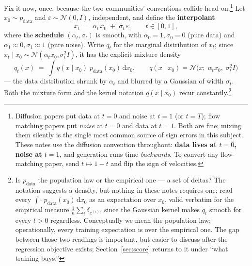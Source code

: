 \documentclass[10pt,a4paper]{article}
\newcommand{\dd}{\mathrm{d}}
\newcommand{\veps}{\varepsilon}
\begin{document}
Fix it now, once, because the two communities' conventions collide
head-on.\footnote{Diffusion papers put data at $t=0$ and noise at $t=1$ (or
$t=T$); flow matching papers put \emph{noise} at $t=0$ and data at $t=1$.
Both are fine; mixing them silently is the single most common source of
sign errors in this subject. These notes use the diffusion convention
throughout: \textbf{data lives at $t=0$, noise at $t=1$}, and generation
runs time \emph{backwards}. To convert any flow-matching paper, send
$t \mapsto 1 - t$ and flip the sign of velocities.}
Let $x_0 \sim p_{\mathrm{data}}$ and $\veps \sim \mathcal{N}(0, I)$,
independent, and define the \textbf{interpolant}
\begin{equation}
x_t \;=\; \alpha_t\, x_0 \;+\; \sigma_t\, \veps,
\qquad t \in [0, 1],
\label{eq:interpolant}
\end{equation}
where the \textbf{schedule} $(\alpha_t, \sigma_t)$ is smooth, with
$\alpha_0 = 1, \sigma_0 = 0$ (pure data) and
$\alpha_1 \approx 0, \sigma_1 \approx 1$ (pure noise). Write $q_t$ for the
marginal distribution of $x_t$; since
$x_t \mid x_0 \sim \mathcal{N}(\alpha_t x_0, \sigma_t^2 I)$, it has the
explicit mixture density
\begin{equation}
q_t(x) \;=\; \int q(x \mid x_0)\; p_{\mathrm{data}}(x_0)\, \dd x_0,
\qquad
q(x \mid x_0) = \mathcal{N}\big(x;\; \alpha_t x_0,\; \sigma_t^2 I\big)
\label{eq:qt}
\end{equation}
--- the data distribution shrunk by $\alpha_t$ and blurred by a Gaussian
of width $\sigma_t$. Both the mixture form and the kernel notation
$q(x \mid x_0)$ recur constantly.\footnote{Is $p_{\mathrm{data}}$ the
population law or the empirical one --- a set of deltas? The notation
suggests a density, but nothing in these notes requires one: read every
$\int \cdot\; p_{\mathrm{data}}(x_0)\, \dd x_0$ as an expectation over
$x_0$, valid verbatim for the empirical measure
$\frac1n \sum_i \delta_{x^{(i)}}$, since the Gaussian kernel makes $q_t$
smooth for every $t > 0$ regardless. Conceptually we mean the population
law; operationally, every training expectation is over the empirical
one. The gap between those two readings is important, but easier to
discuss after the regression objective exists; Section~\ref{sec:score}
returns to it under ``what training buys.''}
\end{document}
